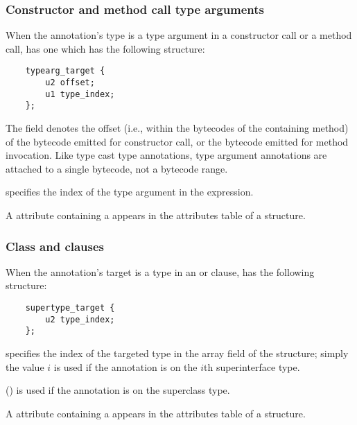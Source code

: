 \documentclass[10pt]{article}
\begin{document}
\subsubsection{Constructor and method call type arguments\label{class-file:ext:ri:con-typearg}}

When the annotation's type is a type argument in a constructor call or
a method call,  has one 
which has the following structure:

\begin{Verbatim}
    typearg_target {
        u2 offset;
        u1 type_index;
    };
\end{Verbatim}

The  field denotes the offset (i.e., within the bytecodes
of the containing method) of the  bytecode emitted for
constructor call, or the
 bytecode emitted for
method invocation.  Like type cast type annotations, type argument
annotations are attached to a single bytecode, not a bytecode range.

 specifies the index of the type argument in the
expression.

A \RuntimeInOrVisibleTypeAnnotations attribute containing a
 appears in the attributes table of a
 structure.


\subsubsection{Class  and  clauses\label{class-file:ext:ri:extends}}

When the annotation's target is a type in an  or
 clause,  has the following
structure:

\begin{Verbatim}
    supertype_target {
        u2 type_index;
    };
\end{Verbatim}

 specifies the index of the targeted type in the
 array field of the  structure;
simply the value $i$ is used if the annotation is on the $i$th
superinterface type.

 () is used if the annotation is on the superclass type.

A \RuntimeInOrVisibleTypeAnnotations attribute containing a
 appears in the attributes table of a
 structure.
\end{document}
